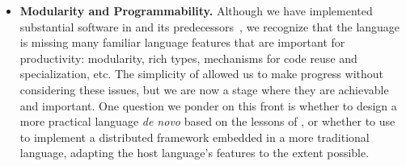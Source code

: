 \begin{itemize}
    \item {\bf Modularity and Programmability.}  Although we have implemented substantial software in \lang and its predecessors~\cite{p2}, we recognize that the language is missing many familiar language features that are important for productivity: modularity, rich types, mechanisms for code reuse and specialization, etc.  The simplicity of \lang allowed us to make progress without considering these issues, but we are now a stage where they are achievable and important.  One question we ponder on this front is whether to design a more practical language {\em de novo} based on the lessons of \lang, or whether to use \lang to implement a distributed framework embedded in a more traditional language, adapting the host language's features to the extent possible.
    
\end{itemize}
